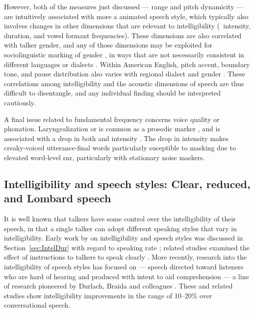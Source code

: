 However, both of the measures just discussed — \fo{} range and pitch dynamicity — are intuitively associated with more a animated speech style, which typically also involves changes in other dimensions that are relevant to intelligibility (\viz\ intensity, duration, and vowel formant frequencies).  These dimensions are also correlated with talker gender, and any of those dimensions may be exploited for sociolinguistic marking of gender \citep[see, \eg][]{McconnellGinet1978}, in ways that are not necessarily consistent in different languages or dialects \citep[\eg][]{Yuasa2008}.  Within American English, pitch accent, boundary tone, and pause distribution also varies with regional dialect and gender \citep{ClopperSmiljanic2011}.  These correlations among intelligibility and the acoustic dimensions of speech are thus difficult to disentangle, and any individual finding should be interpreted cautiously.

A final issue related to fundamental frequency concerns voice quality or phonation.  Laryngealization or  is common as a prosodic marker \citep{Lehiste1979, Kreiman1982, DilleyEtAl1996}, and is associated with a drop in both \fo{} and intensity \citep{GordonLadefoged2001}.  The drop in intensity makes creaky-voiced utterance-final words particularly suceptible to masking due to elevated word-level \ac{snr}, particularly with stationary noise maskers.


\subsection[Intelligibility and speech styles]{Intelligibility and speech styles: Clear, reduced, and Lombard speech}
It is well known that talkers have some control over the intelligibility of their speech, in that a single talker can adopt different speaking styles that vary in intelligibility.  Early work by \citeauthor{Tolhurst1957a} on intelligibility and speech styles was discussed in Section~\ref{sec:IntelDur} with regard to speaking rate \citep{Tolhurst1957a}; related studies examined the effect of instructions to talkers to speak clearly \citep{Tolhurst1954, Tolhurst1955}.  More recently, research into the intelligibility of speech styles has focused on  — speech directed toward listeners who are hard of hearing and produced with intent to aid comprehension — a line of research pioneered by Durlach, Braida and colleagues \citep[\eg][]{PichenyEtAl1985, PichenyEtAl1986, PichenyEtAl1989, UchanskiEtAl1996, KrauseBraida2004}.  These and related studies show intelligibility improvements in the range of 10–20\% over conversational speech.

